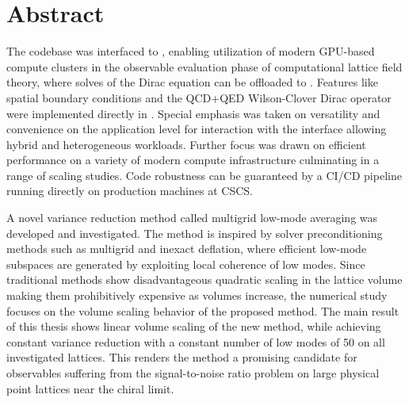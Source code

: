 \begingroup
\let\clearpage\relax
\let\cleardoublepage\relax
\let\cleardoublepage\relax

\chapter*{Abstract}

The \openqxd codebase was interfaced to \quda, enabling utilization of modern GPU-based compute clusters in the observable evaluation phase of computational lattice field theory, where solves of the Dirac equation can be offloaded to \quda.
Features like spatial \Cstar boundary conditions and the QCD+QED Wilson-Clover Dirac operator were implemented directly in \quda.
Special emphasis was taken on versatility and convenience on the application level for interaction with the interface allowing hybrid and heterogeneous workloads.
Further focus was drawn on efficient performance on a variety of modern compute infrastructure culminating in a range of scaling studies.
Code robustness can be guaranteed by a CI/CD pipeline running directly on production machines at CSCS.

A novel variance reduction method called multigrid low-mode averaging was developed and investigated.
The method is inspired by solver preconditioning methods such as multigrid and inexact deflation, where efficient low-mode subspaces are generated by exploiting local coherence of low modes.
Since traditional methods show disadvantageous quadratic scaling in the lattice volume making them prohibitively expensive as volumes increase, the numerical study focuses on the volume scaling behavior of the proposed method.
The main result of this thesis shows linear volume scaling of the new method, while achieving constant variance reduction with a constant number of low modes of \num{50} on all investigated lattices.
This renders the method a promising candidate for observables suffering from the signal-to-noise ratio problem on large physical point lattices near the chiral limit.

\endgroup

\cleardoublepage%

\begingroup
\let\clearpage\relax
\let\cleardoublepage\relax
\let\cleardoublepage\relax

